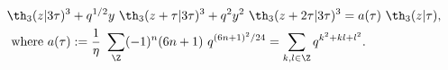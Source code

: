 \begin{equation}
    \begin{split}
\th_3(z|3\tau)^3 &+ q^{1/2} y ~\th_3(z+\tau |3\tau)^3 + q^{2} y^2
    ~\th_3(z+2\tau |3\tau)^3 = a(\tau) ~\th_3(z|\tau), \\
  {\rm where } ~a(\tau) &:={1\over\eta}~\sum_\Z (-1)^n (6n+1)
    ~q^{(6n+1)^2 /24} = \sum_{k,l\in\Z} q^{k^2+kl+l^2}.
     \end{split}
  \end{equation}

